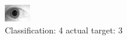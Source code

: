 \begin{figure}[h!]
\begin{center}
\includegraphics[width=0.60\columnwidth]{figures/ID1892_class_4_target_3.png}
\end{center}
\caption{ Classification: 4 actual target: 3}
\label{fig:ID1892_class_4_target_3}
\end{figure}

